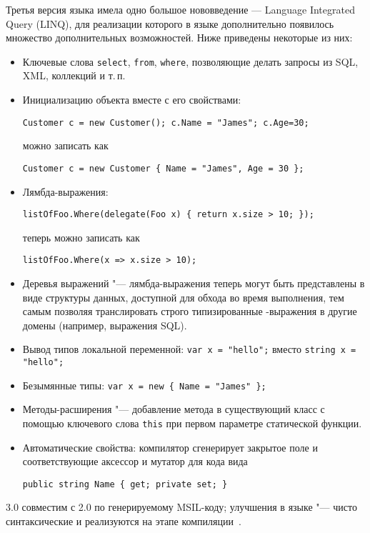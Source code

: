 Третья версия языка имела одно большое нововведение --- Language Integrated Query (LINQ), для реализации которого в языке дополнительно появилось множество дополнительных возможностей.
Ниже приведены некоторые из них:
\begin{itemize}
  \item Ключевые слова \lstinline[style=csharpinlinestyle]!select!, \lstinline[style=csharpinlinestyle]!from!, \lstinline[style=csharpinlinestyle]!where!, позволяющие делать запросы из SQL, XML, коллекций и т.\,п.

  \item Инициализацию объекта вместе с его свойствами:
  \begin{lstlisting}[style=csharpinlinestyle]
Customer c = new Customer(); c.Name = "James"; c.Age=30;
  \end{lstlisting}
  можно записать как
  \begin{lstlisting}[style=csharpinlinestyle]
Customer c = new Customer { Name = "James", Age = 30 };
  \end{lstlisting}

  \item Лямбда-выражения:
  \begin{lstlisting}[style=csharpinlinestyle]
listOfFoo.Where(delegate(Foo x) { return x.size > 10; });
  \end{lstlisting}
  теперь можно записать как
  \begin{lstlisting}[style=csharpinlinestyle]
listOfFoo.Where(x => x.size > 10);
  \end{lstlisting}

  \item Деревья выражений "--- лямбда-выражения теперь могут быть представлены в виде структуры данных, доступной для обхода во время выполнения, тем самым позволяя транслировать строго типизированные \csharp{}-выражения в другие домены (например, выражения SQL).

  \item Вывод типов локальной переменной: \lstinline[style=csharpinlinestyle]!var x = "hello";! вместо \lstinline[style=csharpinlinestyle]!string x = "hello";!

  \item Безымянные типы: \lstinline[style=csharpinlinestyle]!var x = new { Name = "James" };!

  \item Методы-расширения "--- добавление метода в существующий класс с помощью ключевого слова \lstinline[style=csharpinlinestyle]!this! при первом параметре статической функции.

  \item Автоматические свойства: компилятор сгенерирует закрытое  поле и соответствующие аксессор и мутатор для кода вида
  \begin{lstlisting}[style=csharpinlinestyle]
public string Name { get; private set; }
  \end{lstlisting}

\end{itemize}
\csharp{} 3.0 совместим с \csharp{} 2.0 по генерируемому MSIL-коду; улучшения в языке "--- чисто синтаксические и реализуются на этапе компиляции~\cite{csharp_wiki_2013_ru}.

